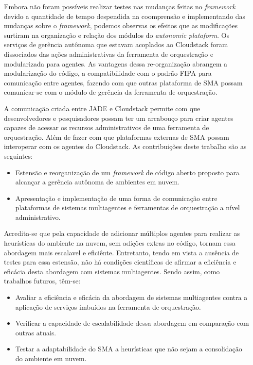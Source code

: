 Embora não foram possíveis realizar testes nas mudanças feitas no \textit{framework} devido a quantidade de tempo despendida na coomprensão e implementando das mudanças sobre o \textit{framework}, podemos observas os efeitos que as modificações surtiram na organização e relação dos módulos do \textit{autonomic plataform}. Os serviços de gerência autônoma que estavam acoplados ao Cloudstack foram dissociados das ações administrativas da ferramenta de orquestração e modularizada para agentes. As vantagens dessa re-organização abrangem a modularização do código, a compatibilidade com o padrão FIPA para comunicação entre agentes, fazendo com que outras plataforma de SMA possam comunicar-se com o módulo de gerência da ferramenta de orquestração.

A comunicação criada entre JADE e Cloudstack permite com que desenvolvedores e pesquisadores possam ter um arcabouço para criar agentes capazes de acessar os recursos administrativos de uma ferramenta de orquestração. Além de fazer com que plataformas externas de SMA possam interoperar com os agentes do Cloudstack. As contribuições deste trabalho são as seguintes:

\begin{itemize}
	\item Estensão e reorganização de um \textit{framework} de código aberto proposto para alcançar a gerência autônoma de ambientes em nuvem.
	\item Apresentação e implementação de uma forma de comunicação entre plataformas de sistemas multiagentes e ferramentas de orquestração a nível administrativo.
\end{itemize}

Acredita-se que pela capacidade de adicionar múltiplos agentes para realizar as heurísticas do ambiente na nuvem, sem adições extras no código, tornam essa abordagem mais escalavel e eficiênte. Entretanto, tendo em vista a ausência de testes para essa estensão, não há condições científicas de afirmar a eficiência e eficácia desta abordagem com sistemas multiagentes. Sendo assim, como trabalhos futuros, têm-se:

\begin{itemize}
	\item Avaliar a eficiência e eficácia da abordagem de sistemas multiagentes contra a aplicação de serviços imbuídos na ferramenta de orquestração.
	\item Verificar a capacidade de escalabilidade dessa abordagem em comparação com outras atuais.
	\item Testar a adaptabilidade do SMA a heurísticas que não sejam a consolidação do ambiente em nuvem.
\end{itemize}

